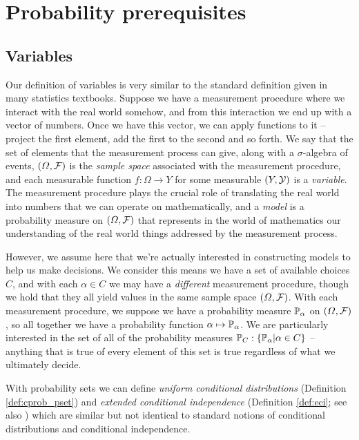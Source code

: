 

\section{Probability prerequisites}\label{sec:vague_variables}


\subsection{Variables}

Our definition of variables is very similar to the standard definition given in many statistics textbooks. Suppose we have a measurement procedure where we interact with the real world somehow, and from this interaction we end up with a vector of numbers. Once we have this vector, we can apply functions to it -- project the first element, add the first to the second and so forth. We say that the set of elements that the measurement process can give, along with a $\sigma$-algebra of events, $(\Omega,\mathcal{F})$ is the \emph{sample space} associated with the measurement procedure, and each measurable function $f:\Omega\to Y$ for some measurable $(Y,\mathcal{Y})$ is a \emph{variable}. The measurement procedure plays the crucial role of translating the real world into numbers that we can operate on mathematically, and a \emph{model} is a probability measure on $(\Omega,\mathcal{F})$ that represents in the world of mathematics our understanding of the real world things addressed by the measurement process.

However, we assume here that we're actually interested in constructing models to help us make decisions. We consider this means we have a set of available choices $C$, and with each $\alpha\in C$ we may have a \emph{different} measurement procedure, though we hold that they all yield values in the same sample space $(\Omega,\mathcal{F})$. With each measurement procedure, we suppose we have a probability measure $\mathbb{P}_\alpha$ on $(\Omega,\mathcal{F})$, so all together we have a probability function $\alpha\mapsto \mathbb{P}_\alpha$. We are particularly interested in the set of all of the probability measures $\mathbb{P}_C:\{\mathbb{P}_\alpha|\alpha\in C\}$ -- anything that is true of every element of this set is true regardless of what we ultimately decide.

With probability sets we can define \emph{uniform conditional distributions} (Definition \ref{def:cprob_pset}) and \emph{extended conditional independence} (Definition \ref{def:eci}; see also \citet{constantinou_extended_2017}) which are similar but not identical to standard notions of conditional distributions and conditional independence.

